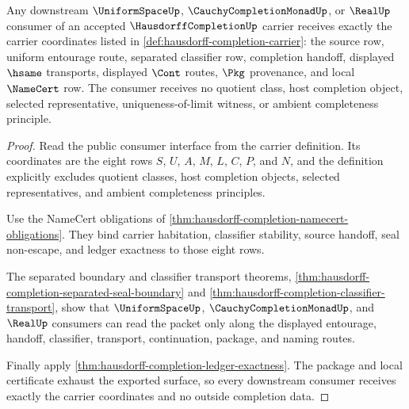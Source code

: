 \begin{theorem}
\label{thm:hausdorff-completion-uniform-consumer-package}
Any downstream $\UniformSpaceUp$, $\CauchyCompletionMonadUp$, or $\RealUp$ consumer of an accepted $\HausdorffCompletionUp$ carrier receives exactly the carrier coordinates listed in \autoref{def:hausdorff-completion-carrier}: the source row, uniform entourage route, separated classifier row, completion handoff, displayed $\hsame$ transports, displayed $\Cont$ routes, $\Pkg$ provenance, and local $\NameCert$ row. The consumer receives no quotient class, host completion object, selected representative, uniqueness-of-limit witness, or ambient completeness principle.
\end{theorem}
\begin{proof}
Read the public consumer interface from the carrier definition. Its coordinates are the eight rows $S$, $U$, $A$, $M$, $L$, $C$, $P$, and $N$, and the definition explicitly excludes quotient classes, host completion objects, selected representatives, and ambient completeness principles.

Use the NameCert obligations of \autoref{thm:hausdorff-completion-namecert-obligations}. They bind carrier habitation, classifier stability, source handoff, seal non-escape, and ledger exactness to those eight rows.

The separated boundary and classifier transport theorems, \autoref{thm:hausdorff-completion-separated-seal-boundary} and \autoref{thm:hausdorff-completion-classifier-transport}, show that $\UniformSpaceUp$, $\CauchyCompletionMonadUp$, and $\RealUp$ consumers can read the packet only along the displayed entourage, handoff, classifier, transport, continuation, package, and naming routes.

Finally apply \autoref{thm:hausdorff-completion-ledger-exactness}. The package and local certificate exhaust the exported surface, so every downstream consumer receives exactly the carrier coordinates and no outside completion data.
\end{proof}

